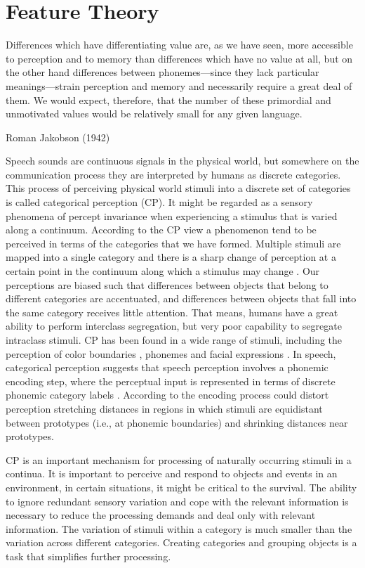 \chapter{Feature Theory}
\label{cp:featuretheory}
\epigraph{Differences which have differentiating value are, as we have seen, more
accessible to perception and to memory than differences which have no value at
all, but on the other hand differences between phonemes—since they lack
particular meanings—strain perception and memory and necessarily require a
great deal of them. We would expect, therefore, that the number of these
primordial and unmotivated values would be relatively small for any given
language.}{Roman Jakobson (1942)}

Speech sounds are continuous signals in the physical world, but somewhere on the communication process they are interpreted by humans as discrete categories. This process of perceiving physical world stimuli into a discrete set of categories is called categorical perception (CP). It might be regarded as a sensory phenomena of percept invariance when experiencing a stimulus that is varied along a continuum.  According to the CP view a phenomenon tend to be perceived in terms of the categories that we have formed. Multiple stimuli are mapped into a single category and there is a sharp change of perception at a certain point in the continuum along which a stimulus may change \citep{liberman1957}. Our perceptions are biased such that differences between objects that belong to different categories are accentuated, and differences between objects that fall into the same category receives little attention. That means, humans have a great ability to perform interclass segregation, but very poor capability to segregate intraclass stimuli. CP has been found in a wide range of stimuli, including the perception of color boundaries \citep{korda1984}, phonemes \citep{liberman1957} and facial expressions \citep{etcoff1992}. In speech, categorical perception suggests that speech perception involves a phonemic encoding step, where the perceptual input is represented in terms of discrete phonemic category labels \cite{liberman1957}. According to \cite{kuhl2000} the encoding process could distort perception stretching distances in regions in which stimuli are equidistant between prototypes (i.e., at phonemic boundaries) and shrinking distances near prototypes.

CP is an important mechanism for processing of naturally occurring stimuli in a continua. It is important to
perceive and respond to objects and events in an environment, in certain situations, it might be critical to the
survival. The ability to ignore redundant sensory variation and cope with the relevant information is necessary
to reduce the processing demands and deal only with relevant information. The variation of stimuli within a category
is much smaller than the variation across different categories. Creating categories and grouping objects is
a task that simplifies further processing.

